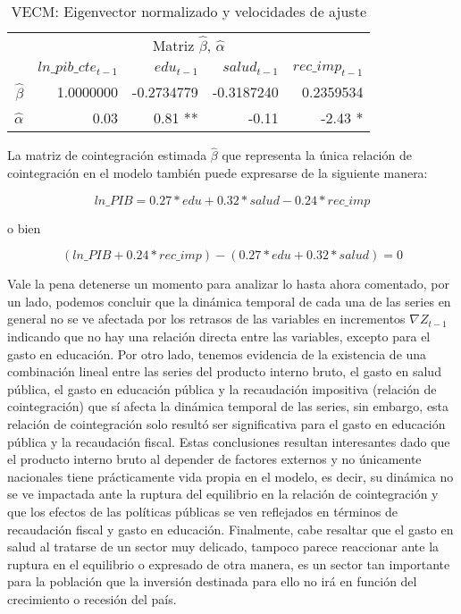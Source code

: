 \begin{table}[H]
\begin{center}
    \begin{tabular}{rrrrr}
    \hline
    \multicolumn{5}{c}{Matriz $\hat{\beta}$, $\hat{\alpha}$} \\
        \cline{1-5}
        			  				& $ln\_pib\_cte_{t-1}$		 		& $edu_{t-1}$			  			& $salud_{t-1}$			& $rec\_imp_{t-1}$  \\
        \hline
        $\hat{\beta}$						&	1.0000000					&	 -0.2734779  					&	 -0.3187240    		&	0.2359534	\\
        $\hat{\alpha}$						&	0.03							&	0.81 **		  				&	 -0.11 	    		&	-2.43 * 	 	\\
        \hline
    \end{tabular}
\end{center}
\caption {VECM: Eigenvector normalizado y velocidades de ajuste} \label{tab:ect1} 
\end{table}


 La matriz de cointegración estimada $\hat{\beta}$ que representa la única relación de cointegración en el modelo también puede expresarse de la siguiente manera:

\begin{equation}
ln\_PIB = 0.27*edu + 0.32*salud - 0.24*rec\_imp 
\end{equation}

o bien

\begin{equation} \label{eq:rel_coint2}
(ln\_PIB  + 0.24*rec\_imp) - (0.27*edu + 0.32*salud) =  0
\end{equation}


Vale la pena detenerse un momento para analizar lo hasta ahora comentado, por un lado, podemos concluir que la dinámica temporal de cada una de las series en general no se ve afectada por los retrasos de las variables en incrementos $\nabla Z_{t-1}$ indicando que no hay una relación directa entre las variables, excepto para el gasto en educación. Por otro lado, tenemos evidencia de la existencia de una combinación lineal entre las series del producto interno bruto, el gasto en salud pública, el gasto en educación pública y la recaudación impositiva (relación de cointegración) que sí afecta la dinámica temporal de las series, sin embargo, esta relación de cointegración solo resultó ser significativa para el gasto en educación pública y la recaudación fiscal. Estas conclusiones resultan interesantes dado que el producto interno bruto al depender de factores externos y no únicamente nacionales tiene prácticamente vida propia en el modelo, es decir, su dinámica no se ve impactada ante la ruptura del equilibrio en la relación de cointegración y que los efectos de las políticas públicas se ven reflejados en términos de recaudación fiscal y gasto en educación. Finalmente, cabe resaltar que el gasto en salud al tratarse de un sector muy delicado, tampoco parece reaccionar ante la ruptura en el equilibrio o expresado de otra manera, es un sector tan importante para la población que la inversión destinada para ello no irá en función del crecimiento o recesión del país.

